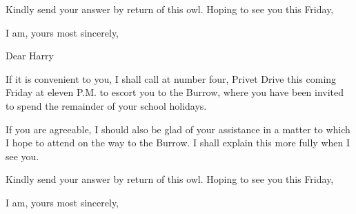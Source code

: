 \documentclass[11pt]{IFSCommunication}
\begin{document}
Kindly send your answer by return of this owl. Hoping to see you this Friday,

\closing{I am, yours most sincerely,}

\clearpage




Dear Harry

If it is convenient to you, I shall call at number four, Privet Drive this coming Friday at eleven P.M. to escort you to the Burrow, where you have been invited to spend the remainder of your school holidays.

If you are agreeable, I should also be glad of your assistance in a matter to which I hope to attend on the way to the Burrow. I shall explain this more fully when I see you.

Kindly send your answer by return of this owl. Hoping to see you this Friday,

\closing{I am, yours most sincerely,}

\clearpage
\end{document}
